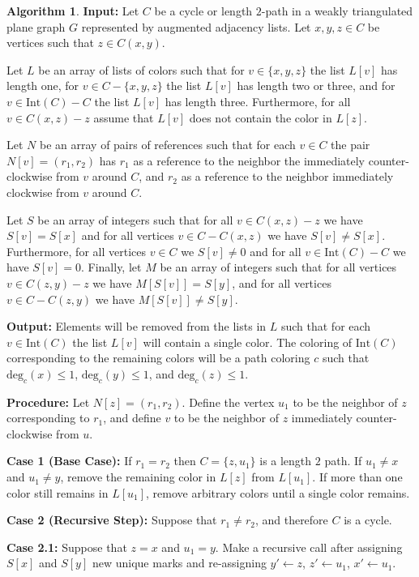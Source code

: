 \documentclass[12pt,letterpaper]{article}
\theoremstyle{plain}
\theoremstyle{definition}
\theoremstyle{break}
\newtheorem{algorithm}[lemma]{Algorithm}     %
\begin{document}
\begin{algorithm}\label{A:hartman_impl}
\textbf{Input:} Let $C$ be a cycle or length $2$-path in a
weakly triangulated plane graph $G$
represented by augmented adjacency lists. Let $x,y,z\in C$ be
vertices such that $z\in C(x,y)$.

Let $L$ be an array of lists of colors
such that for $v\in\{x,y,z\}$ the list $L[v]$ has length one,
for $v\in C-\{x,y,z\}$ the list $L[v]$ has length two
or three, and for $v\in \text{Int}(C)-C$ the list
$L[v]$ has length three. Furthermore, for all $v\in C(x,z) - z$ assume
that $L[v]$ does not contain the color in $L[z]$.

Let $N$ be an array of pairs of
references such that for each $v\in C$ the pair $N[v]=(r_1,r_2)$ has
$r_1$ as a reference to the neighbor the immediately counter-clockwise
from $v$
around $C$, and $r_2$ as a reference
to the neighbor immediately clockwise from $v$ around $C$.

Let $S$ be an array of
integers such that for all $v\in C(x,z)-z$ we have $S[v]=S[x]$ and for
all vertices $v\in C-C(x,z)$ we have $S[v]\ne S[x]$. Furthermore, for all
vertices $v\in C$ we $S[v]\ne 0$ and for all $v\in \text{Int}(C)-C$
we have $S[v]=0$. Finally, let $M$
be an array of integers such that for all vertices $v\in C(z,y)-z$ we have
$M[S[v]]=S[y]$, and for all vertices $v\in C-C(z,y)$ we have $M[S[v]]\ne
S[y]$.

\textbf{Output:} Elements will be removed from the lists in $L$ such that
for each $v\in\text{Int}(C)$ the list $L[v]$ will contain a single color. The
coloring of $\text{Int}(C)$ corresponding to the remaining
colors will be a path
coloring $c$ such that $\text{deg}_c(x)\le1$, $\text{deg}_c(y)\le1$,
and $\text{deg}_c(z)\le1$.

\textbf{Procedure:} Let $N[z]=(r_1,r_2)$. Define the vertex $u_1$ to be
the neighbor of $z$ corresponding to $r_1$, and define $v$ to be the
neighbor of $z$ immediately counter-clockwise from $u$.

\textbf{Case 1 (Base Case):} If $r_1=r_2$ then $C=\{z,u_1\}$
is a length $2$ path. If $u_1\ne x$ and $u_1\ne y$, remove the remaining
color in $L[z]$ from $L[u_1]$. If more than one color still remains in
$L[u_1]$, remove arbitrary colors until a single color remains.

\textbf{Case 2 (Recursive Step):} Suppose that $r_1\ne r_2$, and therefore $C$ is a cycle.

\textbf{Case 2.1:} Suppose that $z=x$ and $u_1=y$. Make a recursive
call after assigning $S[x]$ and $S[y]$ new unique marks and re-assigning
$y'\leftarrow z$, $z'\leftarrow u_1$, $x'\leftarrow u_1$.


\end{algorithm}
\end{document}
